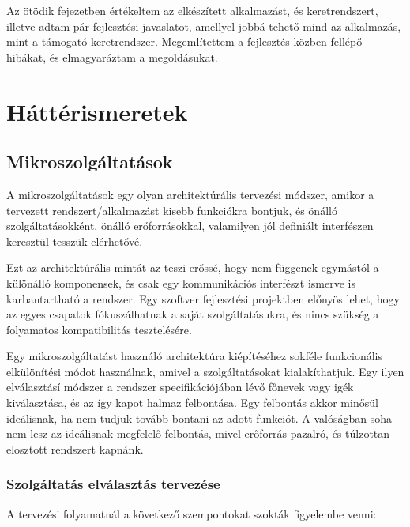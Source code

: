 \documentclass[11pt,magyar,a4paper,twoside,]{report}
\begin{document}
Az ötödik fejezetben értékeltem az elkészített alkalmazást, és
keretrendszert, illetve adtam pár fejlesztési javaslatot, amellyel jobbá
tehető mind az alkalmazás, mint a támogató keretrendszer. Megemlítettem
a fejlesztés közben fellépő hibákat, és elmagyaráztam a megoldásukat.

\chapter{Háttérismeretek}\label{huxe1ttuxe9rismeretek}

\section{Mikroszolgáltatások}\label{mikroszolguxe1ltatuxe1sok}

A mikroszolgáltatások\citep{microservices} \citep{micro-arch}
\citep{microservices-light} egy olyan architektúrális tervezési módszer,
amikor a tervezett rendszert/alkalmazást kisebb funkciókra bontjuk, és
önálló szolgáltatásokként, önálló erőforrásokkal, valamilyen jól
definiált interfészen keresztül tesszük elérhetővé.

Ezt az architektúrális mintát az teszi erőssé, hogy nem függenek
egymástól a különálló komponensek, és csak egy kommunikációs interfészt
ismerve is karbantartható a rendszer. Egy szoftver fejlesztési
projektben előnyös lehet, hogy az egyes csapatok fókuszálhatnak a saját
szolgáltatásukra, és nincs szükség a folyamatos kompatibilitás
tesztelésére.

Egy mikroszolgáltatást használó architektúra kiépítéséhez sokféle
funkcionális elkülönítési módot használnak, amivel a szolgáltatásokat
kialakíthatjuk. Egy ilyen elválasztásí módszer a rendszer
specifikációjában lévő főnevek vagy igék kiválasztása, és az így kapot
halmaz felbontása. Egy felbontás akkor minősül ideálisnak, ha nem tudjuk
tovább bontani az adott funkciót. A valóságban soha nem lesz az
ideálisnak megfelelő felbontás, mivel erőforrás pazalró, és túlzottan
elosztott rendszert kapnánk.

\subsection{\texorpdfstring{Szolgáltatás elválasztás
tervezése\label{splitting}}{Szolgáltatás elválasztás tervezése}}\label{szolguxe1ltatuxe1s-elvuxe1lasztuxe1s-tervezuxe9se}

A tervezési folyamatnál a következő szempontokat szokták figyelembe
venni:
\end{document}
